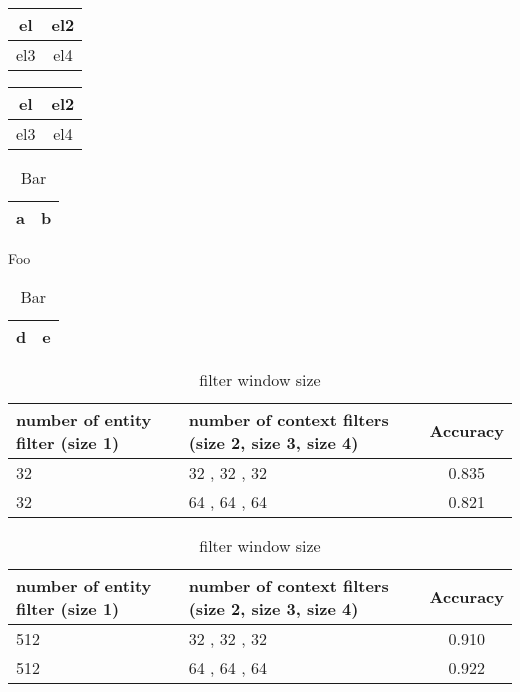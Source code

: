 \documentclass{article}
\begin{document}
\begin{multicols}{2}
\begin{tabular}{|c|c|}
el&el2\\
\hline
el3&el4\\
\hline
\end{tabular}


\begin{tabular}{|c|c|}
el&el2\\
\hline
el3&el4\\
\hline
\end{tabular}

\end{multicols}




\begin{table}
\parbox{.45\linewidth}{
\centering
\begin{tabular}{|c|c|}

\hline
a&b\\
\hline
\end{tabular}
\caption{Foo}
}
\hfill
\parbox{.45\linewidth}{
\centering
\begin{tabular}{|c|c|}
\hline
d&e\\
\hline
\end{tabular}
\caption{Bar}
}
\end{table}






\begin{table}[htbp]
\caption{filter window size}
\label{tab:config_filternum}
 \begin{tabularx}{.5\textwidth}{| X | X | c |} 
 \hline
 number of entity filter (size 1) & number of context filters (size 2, size 3,
 size 4) & Accuracy\\ [2ex] 
 \hline
    32  &  32  ,  32  ,  32  &  0.835 \\ [0.5ex]
    \hline
    32  &  64  ,  64  ,  64  &  0.821 \\ [0.5ex]
    \hline
    \hline
 \end{tabularx}
 \quad
\begin{tabularx}{.5\textwidth}{| X | X | c |} 
 \hline
 number of entity filter (size 1) & number of context filters (size 2, size 3,
 size 4) & Accuracy\\ [2ex] 
 \hline
512  &  32  ,  32  ,  32  &  0.910 \\[0.5ex]
\hline
512  &  64  ,  64  ,  64  &  0.922 \\[0.5ex]
\hline
\hline
\end{tabularx}
\end{table}

\end{document}
